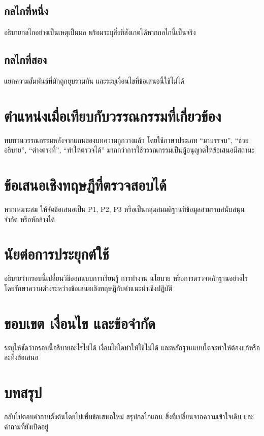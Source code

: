 \documentclass{aick-thai-preprint}
\begin{document}
\subsection{กลไกที่หนึ่ง}
อธิบายกลไกอย่างเป็นเหตุเป็นผล พร้อมระบุสิ่งที่สังเกตได้หากกลไกนี้เป็นจริง

\subsection{กลไกที่สอง}
แยกความสัมพันธ์ที่มักถูกยุบรวมกัน และระบุเงื่อนไขที่ข้อเสนอนี้ใช้ไม่ได้

\section{ตำแหน่งเมื่อเทียบกับวรรณกรรมที่เกี่ยวข้อง}
ทบทวนวรรณกรรมหลังจากแกนของบทความถูกวางแล้ว โดยใช้ภาษาประเภท “มาบรรจบ”, “ช่วยอธิบาย”, “ต่างตรงที่”, “ทำให้ตรวจได้” มากกว่าการใช้วรรณกรรมเป็นผู้อนุญาตให้ข้อเสนอมีสถานะ

\section{ข้อเสนอเชิงทฤษฎีที่ตรวจสอบได้}
หากเหมาะสม ให้จัดข้อเสนอเป็น P1, P2, P3 หรือเป็นกลุ่มสมมติฐานที่ข้อมูลสามารถสนับสนุน จำกัด หรือหักล้างได้

\section{นัยต่อการประยุกต์ใช้}
อธิบายว่ากรอบนี้เปลี่ยนวิธีออกแบบการเรียนรู้ การทำงาน นโยบาย หรือการตรวจหลักฐานอย่างไร โดยรักษาความต่างระหว่างข้อเสนอเชิงทฤษฎีกับคำแนะนำเชิงปฏิบัติ

\section{ขอบเขต เงื่อนไข และข้อจำกัด}
ระบุให้ชัดว่ากรอบนี้อธิบายอะไรไม่ได้ เงื่อนไขใดทำให้ใช้ไม่ได้ และหลักฐานแบบใดจะทำให้ต้องแก้หรือละทิ้งข้อเสนอ

\section{บทสรุป}
กลับไปตอบคำถามตั้งต้นโดยไม่เพิ่มข้อเสนอใหม่ สรุปกลไกแกน สิ่งที่เปลี่ยนจากความเข้าใจเดิม และคำถามที่ยังเปิดอยู่

\end{document}
